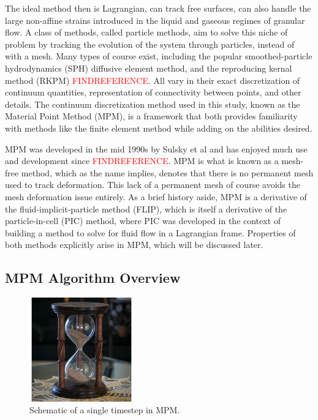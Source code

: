 The ideal method then is Lagrangian, can track free surfaces, can also handle the large non-affine strains introduced in the liquid and gaseous regimes of granular flow. A class of methods, called particle methods, aim to solve this niche of problem by tracking the evolution of the system through particles, instead of with a mesh. Many types of course exist, including the popular smoothed-particle hydrodynamics (SPH) diffusive element method, and the reproducing kernal method (RKPM) \textcolor{red}{FINDREFERENCE}. All vary in their exact discretization of continuum quantities, representation of connectivity between points, and other details. The continuum discretization method used in this study, known as the Material Point Method (MPM), is a framework that both provides familiarity with methods like the finite element method while adding on the abilities desired.

MPM was developed in the mid 1990s by Sulsky et al and has enjoyed much use and development since \cite{Sulsky:1994}\textcolor{red}{FINDREFERENCE}. MPM is what is known as a mesh-free method, which as the name implies, denotes that there is no permanent mesh used to track deformation. This lack of a permanent mesh of course avoids the mesh deformation issue entirely. As a brief history aside, MPM is a derivative of the fluid-implicit-particle method (FLIP), which is itself a derivative of the particle-in-cell (PIC) method, where PIC was developed in the context of building a method to solve for fluid flow in a Lagrangian frame. Properties of both methods explicitly arise in MPM, which will be discussed later.

\subsection{MPM Algorithm Overview}

\begin{figure}[htp] 
    \centering
    \includegraphics[width=0.4\textwidth]{figs/hourglass_whole.jpg}
    \caption{Schematic of a single timestep in MPM.}
    \label{MPM_diagram}
\end{figure}

